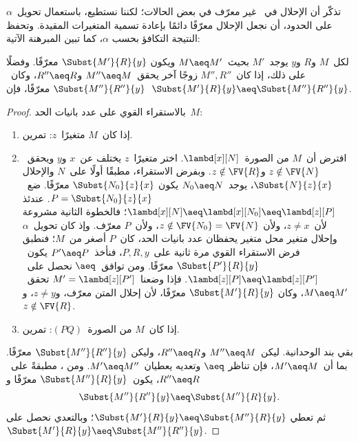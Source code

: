 \documentclass[../../../include/open-logic-section]{subfiles}
\begin{document}
تذكّر أن الإحلال في~ غير معرّف في بعض الحالات؛ لكننا
نستطيع، باستعمال تحويل~$\alpha$ على الحدود، أن نجعل الإحلال معرّفًا
دائمًا بإعادة تسمية المتغيرات المقيدة. وتحفظ النتيجة التكافؤ بحسب
$\alpha$، كما تبين المبرهنة الآتية:

\begin{thm}
  لكل~$M$ و$R$ و$y$ يوجد~$M'$ بحيث~$M \aeq M'$ ويكون
  $\Subst{M'}{R}{y}$ معرّفًا. وفضلًا على ذلك، إذا كان~$M'',R''$ زوجًا
  آخر يحقق~$M'' \aeq M$ و$R'' \aeq R$، وكان~$\Subst{M''}{R''}{y}$
  معرّفًا، فإن~$\Subst{M'}{R}{y} \aeq \Subst{M''}{R''}{y}$.
\end{thm}

\begin{proof}
  بالاستقراء القوي على عدد بانيات الحد~$M$:
  \begin{enumerate}
  \item إذا كان~$M$ متغيرًا~$z$: تمرين.
  \item افترض أن~$M$ من الصورة~$\lambd[x][N]$. اختر متغيرًا~$z$
    يختلف عن~$x$ و$y$ ويحقق~$z \notin \FV{N}$ و$z \notin \FV{R}$.
    وبفرض الاستقراء، مطبقًا أولًا على~$N$ والإحلال
    $\Subst{N}{z}{x}$، يوجد~$N_0 \aeq N$ يكون
    $\Subst{N_0}{z}{x}$ معرّفًا. ضع~$P=\Subst{N_0}{z}{x}$.
    عندئذ
    $\lambd[x][N] \aeq \lambd[x][N_0] \aeq \lambd[z][P]$؛
    فالخطوة الثانية مشروعة لأن~$z\ne x$، ولأن
    $z\notin\FV{N_0}=\FV{N}$، ولأن~$P$ معرّف.
    وإذ كان تحويل~$\alpha$ وإحلال متغير محل متغير يحفظان عدد بانيات
    الحد، كان~$P$ أصغر من~$M$؛ فنطبق فرض الاستقراء القوي مرة ثانية
    على~$P,R,y$،
    فنأخذ~$P'\aeq P$ يكون~$\Subst{P'}{R}{y}$ معرّفًا.
    ومن توافق~$\aeq$ نحصل على~$\lambd[z][P]\aeq\lambd[z][P']$.
    فإذا وضعنا~$M'=\lambd[z][P']$ تحقق~$M\aeq M'$، وكان
    $\Subst{M'}{R}{y}$ معرّفًا، لأن إحلال المتن معرّف، و$z\ne y$،
    و$z\notin\FV{R}$.

    \item إذا كان~$M$ من الصورة~$(PQ)$: تمرين.
  \end{enumerate}

  بقي بند الوحدانية. ليكن~$M''\aeq M$ و$R''\aeq R$، وليكن
  $\Subst{M''}{R''}{y}$ معرّفًا. بما أن~$M'\aeq M$، فإن تناظر
  $\aeq$ وتعديه يعطيان~$M'\aeq M''$. ومن ، مطبقةً
  على~$R''\aeq R$، يكون~$\Subst{M''}{R}{y}$ معرّفًا و
  \[
    \Subst{M''}{R''}{y}\aeq\Subst{M''}{R}{y}.
  \]
  ثم تعطي 
  $\Subst{M'}{R}{y}\aeq\Subst{M''}{R}{y}$؛ وبالتعدي نحصل على
  $\Subst{M'}{R}{y}\aeq\Subst{M''}{R''}{y}$.
\end{proof}
\end{document}
